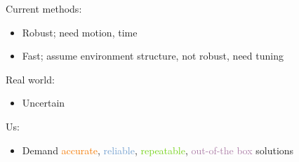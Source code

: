 \begin{frame}{}

  Current methods:
  \begin{itemize}
    \item \textcolor[RGB]{78,154,6}{Robust}; \textcolor[RGB]{204,0,0}{need motion, time}
    \item \textcolor[RGB]{78,154,6}{Fast}; \textcolor[RGB]{204,0,0}{assume environment structure, not robust, need tuning}
  \end{itemize}
  \vspace{2em}

  Real world:
  \begin{itemize}
    \item Uncertain
  \end{itemize}
  \vspace{2em}

  Us:
  \begin{itemize}
    \item Demand \textcolor[HTML]{F57900}{accurate}, \textcolor[HTML]{729FCF}{reliable}, \textcolor[HTML]{73D216}{repeatable}, \textcolor[HTML]{AD7FA8}{out-of-the box} solutions
  \end{itemize}

\end{frame}
